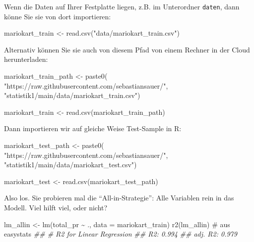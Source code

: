 \documentclass[
  letterpaper,
  oneside,
  open=any]{scrbook}
\newenvironment{Shaded}{\begin{snugshade}}{\end{snugshade}}
\newcommand{\AttributeTok}[1]{\textcolor[rgb]{0.40,0.45,0.13}{#1}}
\newcommand{\CommentTok}[1]{\textcolor[rgb]{0.37,0.37,0.37}{#1}}
\newcommand{\DocumentationTok}[1]{\textcolor[rgb]{0.37,0.37,0.37}{\textit{#1}}}
\newcommand{\FunctionTok}[1]{\textcolor[rgb]{0.28,0.35,0.67}{#1}}
\newcommand{\NormalTok}[1]{\textcolor[rgb]{0.00,0.23,0.31}{#1}}
\newcommand{\OtherTok}[1]{\textcolor[rgb]{0.00,0.23,0.31}{#1}}
\newcommand{\SpecialCharTok}[1]{\textcolor[rgb]{0.37,0.37,0.37}{#1}}
\newcommand{\StringTok}[1]{\textcolor[rgb]{0.13,0.47,0.30}{#1}}
\theoremstyle{definition}
\theoremstyle{definition}
\theoremstyle{definition}
\theoremstyle{remark}
\begin{document}
Wenn die Daten auf Ihrer Festplatte liegen, z.B. im Unterordner
\texttt{daten}, dann könne Sie sie von dort importieren:

\begin{Shaded}
\begin{Highlighting}[]
\NormalTok{mariokart\_train }\OtherTok{\textless{}{-}} \FunctionTok{read.csv}\NormalTok{(}\StringTok{"data/mariokart\_train.csv"}\NormalTok{)}
\end{Highlighting}
\end{Shaded}

Alternativ können Sie sie auch von diesem Pfad von einem Rechner in der
Cloud herunterladen:

\begin{Shaded}
\begin{Highlighting}[]
\NormalTok{mariokart\_train\_path }\OtherTok{\textless{}{-}} \FunctionTok{paste0}\NormalTok{( }\StringTok{"https://raw.githubusercontent.com/sebastiansauer/"}\NormalTok{,}
\StringTok{"statistik1/main/data/mariokart\_train.csv"}\NormalTok{)}

\NormalTok{mariokart\_train }\OtherTok{\textless{}{-}} \FunctionTok{read.csv}\NormalTok{(mariokart\_train\_path)}
\end{Highlighting}
\end{Shaded}

Dann importieren wir auf gleiche Weise Test-Sample in R:

\begin{Shaded}
\begin{Highlighting}[]
\NormalTok{mariokart\_test\_path }\OtherTok{\textless{}{-}} \FunctionTok{paste0}\NormalTok{(}
 \StringTok{"https://raw.githubusercontent.com/sebastiansauer/"}\NormalTok{,}
 \StringTok{"statistik1/main/data/mariokart\_test.csv"}\NormalTok{)}

\NormalTok{mariokart\_test }\OtherTok{\textless{}{-}} \FunctionTok{read.csv}\NormalTok{(mariokart\_test\_path)}
\end{Highlighting}
\end{Shaded}

Also los. Sie probieren mal die \enquote{All-in-Strategie}: Alle
Variablen rein in das Modell. Viel hilft viel, oder nicht?

\begin{Shaded}
\begin{Highlighting}[]
\NormalTok{lm\_allin }\OtherTok{\textless{}{-}} \FunctionTok{lm}\NormalTok{(total\_pr }\SpecialCharTok{\textasciitilde{}}\NormalTok{ ., }\AttributeTok{data =}\NormalTok{ mariokart\_train)}
\FunctionTok{r2}\NormalTok{(lm\_allin)  }\CommentTok{\# aus easystats}
\DocumentationTok{\#\# \# R2 for Linear Regression}
\DocumentationTok{\#\#        R2: 0.994}
\DocumentationTok{\#\#   adj. R2: 0.979}
\end{Highlighting}
\end{Shaded}
\end{document}
